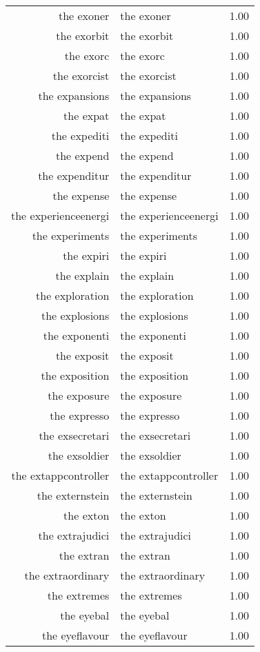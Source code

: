 \begin{table}[ht]
\begin{tabular}{rlr}
  the exoner & the exoner & 1.00 \\ 
  the exorbit & the exorbit & 1.00 \\ 
  the exorc & the exorc & 1.00 \\ 
  the exorcist & the exorcist & 1.00 \\ 
  the expansions & the expansions & 1.00 \\ 
  the expat & the expat & 1.00 \\ 
  the expediti & the expediti & 1.00 \\ 
  the expend & the expend & 1.00 \\ 
  the expenditur & the expenditur & 1.00 \\ 
  the expense & the expense & 1.00 \\ 
  the experienceenergi & the experienceenergi & 1.00 \\ 
  the experiments & the experiments & 1.00 \\ 
  the expiri & the expiri & 1.00 \\ 
  the explain & the explain & 1.00 \\ 
  the exploration & the exploration & 1.00 \\ 
  the explosions & the explosions & 1.00 \\ 
  the exponenti & the exponenti & 1.00 \\ 
  the exposit & the exposit & 1.00 \\ 
  the exposition & the exposition & 1.00 \\ 
  the exposure & the exposure & 1.00 \\ 
  the expresso & the expresso & 1.00 \\ 
  the exsecretari & the exsecretari & 1.00 \\ 
  the exsoldier & the exsoldier & 1.00 \\ 
  the extappcontroller & the extappcontroller & 1.00 \\ 
  the externstein & the externstein & 1.00 \\ 
  the exton & the exton & 1.00 \\ 
  the extrajudici & the extrajudici & 1.00 \\ 
  the extran & the extran & 1.00 \\ 
  the extraordinary & the extraordinary & 1.00 \\ 
  the extremes & the extremes & 1.00 \\ 
  the eyebal & the eyebal & 1.00 \\ 
  the eyeflavour & the eyeflavour & 1.00 \\ 

\end{tabular}
\end{table}
